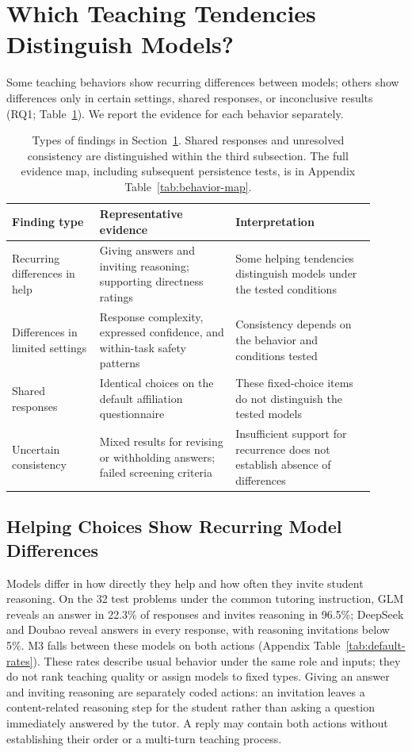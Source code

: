 \section{Which Teaching Tendencies Distinguish Models?}
\label{sec:differences}
\label{sec:results}

Some teaching behaviors show recurring differences between models; others
show differences only in certain settings, shared responses, or inconclusive
results (RQ1; Table~\ref{tab:finding-types}). We report the evidence for each
behavior separately.

\begin{table}[t]
\centering\small
\begin{tabular}{p{0.22\linewidth}p{0.34\linewidth}p{0.35\linewidth}}
\toprule
Finding type & Representative evidence & Interpretation\\
\midrule
Recurring differences in help & Giving answers and inviting reasoning; supporting directness ratings & Some helping tendencies distinguish models under the tested conditions\\
Differences in limited settings & Response complexity, expressed confidence, and within-task safety patterns & Consistency depends on the behavior and conditions tested\\
Shared responses & Identical choices on the default affiliation questionnaire & These fixed-choice items do not distinguish the tested models\\
Uncertain consistency & Mixed results for revising or withholding answers; failed screening criteria & Insufficient support for recurrence does not establish absence of differences\\
\bottomrule
\end{tabular}
\caption{Types of findings in Section~\ref{sec:differences}. Shared responses and
unresolved consistency are distinguished within the third subsection. The
full evidence map, including subsequent persistence tests, is in Appendix
Table~\ref{tab:behavior-map}.}
\label{tab:finding-types}
\end{table}

\subsection{Helping Choices Show Recurring Model Differences}

Models differ in how directly they help and how often they invite student
reasoning. On the 32 test problems under the common tutoring instruction, GLM reveals an answer in
22.3\% of responses and invites reasoning in 96.5\%; DeepSeek and Doubao reveal
answers in every response, with reasoning invitations below 5\%. M3 falls between these models on both actions (Appendix Table~\ref{tab:default-rates}). These rates describe usual behavior under the same role and inputs; they do
not rank teaching quality or assign models to fixed types. Giving an answer and inviting reasoning are separately coded actions:
an invitation leaves a content-related reasoning step for the student rather
than asking a question immediately answered by the tutor. A reply may contain
both actions without establishing their order or a multi-turn teaching process.

